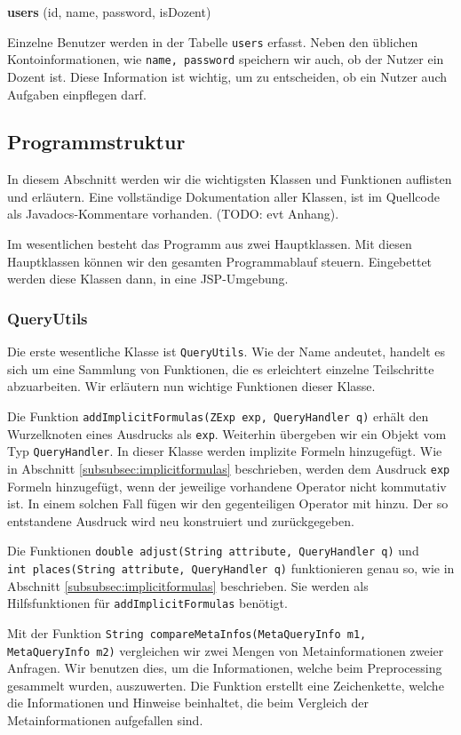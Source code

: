 \textbf{users} (id, name, password, isDozent)

Einzelne Benutzer werden in der Tabelle \verb|users| erfasst. Neben den üblichen Kontoinformationen, wie \verb|name, password| speichern wir auch, ob der Nutzer ein Dozent ist. Diese Information ist wichtig, um zu entscheiden, ob ein Nutzer auch Aufgaben einpflegen darf.

\subsection{Programmstruktur}

In diesem Abschnitt werden wir die wichtigsten Klassen und Funktionen auflisten und erläutern. Eine vollständige Dokumentation aller Klassen, ist im Quellcode als Javadocs-Kommentare vorhanden. (TODO: evt Anhang).

Im wesentlichen besteht das Programm aus zwei Hauptklassen. Mit diesen Hauptklassen können wir den gesamten Programmablauf steuern. Eingebettet werden diese Klassen dann, in eine JSP-Umgebung.

\subsubsection{QueryUtils}

Die erste wesentliche Klasse ist \verb|QueryUtils|. Wie der Name andeutet, handelt es sich um eine Sammlung von Funktionen, die es erleichtert einzelne Teilschritte abzuarbeiten. Wir erläutern nun wichtige Funktionen dieser Klasse.

Die Funktion \verb|addImplicitFormulas(ZExp exp, QueryHandler q)| erhält den Wurzelknoten eines Ausdrucks als \verb|exp|. Weiterhin übergeben wir ein Objekt vom Typ \verb|QueryHandler|. In dieser Klasse werden implizite Formeln hinzugefügt. Wie in Abschnitt \ref{subsubsec:implicitformulas} beschrieben, werden dem Ausdruck \verb|exp|  Formeln hinzugefügt, wenn der jeweilige vorhandene Operator nicht kommutativ ist. In einem solchen Fall fügen wir den gegenteiligen Operator mit hinzu. Der so entstandene Ausdruck wird neu konstruiert und zurückgegeben.

Die Funktionen \verb|double adjust(String attribute, QueryHandler q)| und \\\verb|int places(String attribute, QueryHandler q)| funktionieren genau so, wie in Abschnitt \ref{subsubsec:implicitformulas} beschrieben. Sie werden als Hilfsfunktionen für \verb|addImplicitFormulas| benötigt.

Mit der Funktion \verb|String compareMetaInfos(MetaQueryInfo m1, MetaQueryInfo m2)| vergleichen wir zwei Mengen von Metainformationen zweier Anfragen. Wir benutzen dies, um die Informationen, welche beim Preprocessing gesammelt wurden, auszuwerten. Die Funktion erstellt eine Zeichenkette, welche die Informationen und Hinweise beinhaltet, die beim Vergleich der Metainformationen aufgefallen sind.

